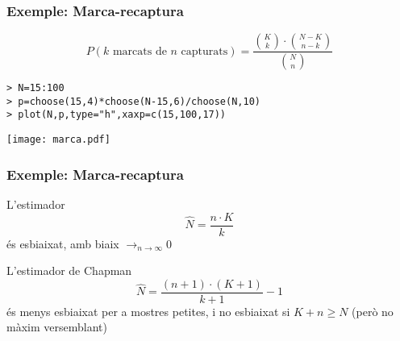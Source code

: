 \documentclass[12pt,t]{beamer}
\renewcommand{\emph}[1]{{\color{red}#1}}
\renewcommand{\geq}{\geqslant}
\def\tendeix{{\displaystyle\mathop{\longrightarrow}_{\scriptscriptstyle
n\to\infty}}}
\theoremstyle{plain}
\theoremstyle{definition}
\begin{document}
\begin{frame}[fragile]
\frametitle{Exemple: Marca-recaptura}
\vspace*{-0.8cm}

$$
P(\mbox{$k$ marcats de $n$ capturats})=\dfrac{\binom{K}{k}\cdot \binom{N-K}{n-k}}{\binom{N}{n}}
$$

\begin{verbatim}
> N=15:100
> p=choose(15,4)*choose(N-15,6)/choose(N,10)
> plot(N,p,type="h",xaxp=c(15,100,17))
\end{verbatim}
\vspace*{-4ex}

\begin{center}
\texttt{[image: marca.pdf]}
\end{center}


\end{frame}


\begin{frame}
\frametitle{Exemple: Marca-recaptura}

L'estimador
$$
\widehat{N}=\frac{n\cdot K}{k}
$$
és esbiaixat, amb biaix $\tendeix 0$
\bigskip

L'\emph{estimador de Chapman}
$$
\widehat{N}=\frac{(n+1)\cdot (K+1)}{k+1}-1
$$
és menys esbiaixat per a mostres petites, i no esbiaixat si $K+n\geq N$ (però no màxim versemblant)
\end{frame}
\end{document}
